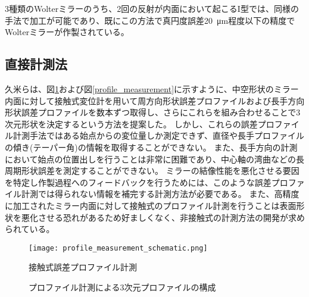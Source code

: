 3種類のWolterミラーのうち、2回の反射が内面において起こるI型では、同様の手法で加工が可能であり、既にこの方法で真円度誤差\SI{20}{\micro \metre}程度以下の精度でWolterミラーが作製されている。\cite{Yamaguchi2020}

\subsection{直接計測法}
\label{chap1_direct_measurement}

久米らは、図\ref{fig:profile_measurement_schematic}および図\ref{profile_measurement}に示すように、中空形状のミラー内面に対して接触式変位計を用いて周方向形状誤差プロファイルおよび長手方向形状誤差プロファイルを数本ずつ取得し、さらにこれらを組み合わせることで3次元形状を決定するという方法を提案した。\cite{Kume2017}
しかし、これらの誤差プロファイル計測手法ではある始点からの変位量しか測定できず、直径や長手プロファイルの傾き(テーパー角)の情報を取得することができない。
また、長手方向の計測において始点の位置出しを行うことは非常に困難であり、中心軸の湾曲などの長周期形状誤差を測定することができない。
ミラーの結像性能を悪化させる要因を特定し作製過程へのフィードバックを行うためには、このような誤差プロファイル計測では得られない情報を補完する計測方法が必要である。
また、高精度に加工されたミラー内面に対して接触式のプロファイル計測を行うことは表面形状を悪化させる恐れがあるため好ましくなく、非接触式の計測方法の開発が求められている。

\begin{figure}[h]
\centering
\texttt{[image: profile\_measurement\_schematic.png]}
\caption{接触式誤差プロファイル計測}
\label{fig:profile_measurement_schematic}
\end{figure}

\begin{figure}[!ht]
\centering
{}
\caption[]{プロファイル計測による3次元プロファイルの構成}
\label{fig:profile_measurement}
\end{figure}


\clearpage
\newpage
